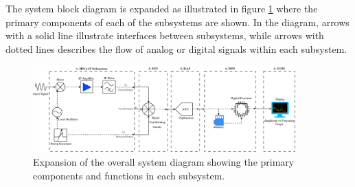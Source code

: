 \documentclass[class=report,11pt,crop=false]{standalone}
\begin{document}
	The system block diagram is expanded as illustrated in figure \ref{fig:system-block-diagram} where the primary components of each of the subsystems are shown. In the diagram, arrows with a solid line illustrate interfaces between subsystems, while arrows with dotted lines describes the flow of analog or digital signals within each subsystem.  
	\begin{figure}[ht!]
		\centering
		\includegraphics[width=0.90\textwidth]{Figures/Methodology/system-block-diagram}
		\caption{Expansion of the overall system diagram showing the primary components and functions in each subsystem.}
		\label{fig:system-block-diagram}
	\end{figure}
	\clearpage
\end{document}
